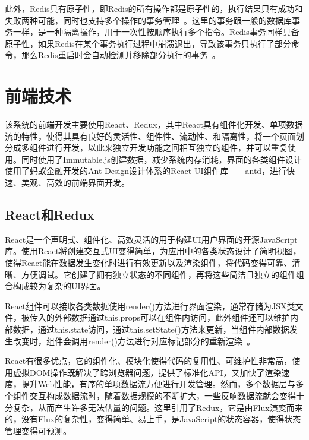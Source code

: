 此外，Redis具有原子性，即Redis的所有操作都是原子性的，执行结果只有成功和失败两种可能，同时也支持多个操作的事务管理~\cite{xmh2019}。这里的事务跟一般的数据库事务一样，是一种隔离操作，用于一次性按顺序执行多个指令。Redis事务同样具备原子性，如果Redis在某个事务执行过程中崩溃退出，导致该事务只执行了部分命令，那么Redis重启时会自动检测并移除部分执行的事务~\cite{wzf}。

\section{前端技术}
该系统的前端开发主要使用React、Redux，其中React具有组件化开发、单项数据流的特性，使得其具有良好的灵活性、组件性、流动性、和隔离性，将一个页面划分成多组件进行开发，以此来独立开发功能之间相互独立的组件，并可以重复使用。同时使用了Immutable.js创建数据，减少系统内存消耗，界面的各类组件设计使用了蚂蚁金融开发的Ant Design设计体系的React UI组件库——antd，进行快速、美观、高效的前端界面开发。\\

\subsection{React和Redux}
React是一个声明式、组件化、高效灵活的用于构建UI用户界面的开源JavaScript库。使用React将创建交互式UI变得简单，为应用中的各类状态设计了简明视图，使得React能在数据发生变化时进行有效更新以及渲染组件，将代码变得可靠、清晰、方便调试。它创建了拥有独立状态的不同组件，再将这些简洁且独立的组件组合构成较为复杂的UI界面。

React组件可以接收各类数据使用render()方法进行界面渲染，通常存储为JSX类文件，被传入的外部数据通过this.props可以在组件内访问，此外组件还可以维护内部数据，通过this.state访问，通过this.setState()方法来更新，当组件内部数据发生改变时，组件会调用render()方法进行对应标记部分的重新渲染~\cite{yxq}。

React有很多优点，它的组件化、模块化使得代码的复用性、可维护性非常高，使用虚拟DOM操作既解决了跨浏览器问题，提供了标准化API，又加快了渲染速度，提升Web性能，有序的单项数据流方便进行开发管理\cite{lh}。然而，多个数据层与多个组件交互构成数据流时，随着数据规模的不断扩大，一些反响数据流就会变得十分复杂，从而产生许多无法估量的问题。这里引用了Redux，它是由Flux演变而来的，没有Flux的复杂性，变得简单、易上手，是JavaScript的状态容器，使得状态管理变得可预测。

